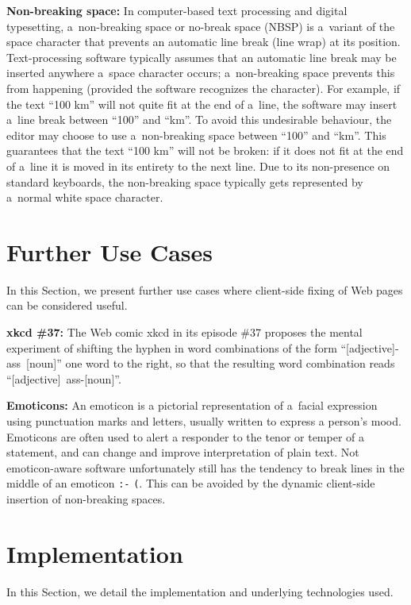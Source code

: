 \documentclass{acm_proc_article-sp}
\begin{document}
\textbf{Non-breaking space:} In computer-based text processing and digital typesetting,
a~non-breaking space or no-break space (NBSP) is a~variant of the space character that prevents an automatic line break (line wrap) at its position.
Text-processing software typically assumes that an automatic line break may be inserted anywhere a~space
character occurs;
a~non-breaking space prevents this from happening (provided the software recognizes the character).
For example, if the text ``100 km'' will not quite fit at the end of a~line,
the software may insert a~line break between ``100'' and ``km''.
To avoid this undesirable behaviour, the editor may choose to use a~non-breaking space between ``100'' and ``km''.
This guarantees that the text ``100 km'' will not be broken:
if it does not fit at the end of a~line
it is moved in its entirety to the next line.
Due to its non-presence on standard keyboards,
the non-breaking space typically gets represented by a~normal white space character.

\section{Further Use Cases}
In this Section, we present further use cases where client-side fixing of Web pages can be considered useful.

\textbf{xkcd \#37:} The Web comic xkcd in its episode \#37 proposes the mental experiment of shifting the hyphen in word combinations of the form \mbox{``[adjective]-ass [noun]''} one word to the right,
so that the resulting word combination reads \mbox{``[adjective] ass-[noun]''}.

\textbf{Emoticons:} An emoticon is a pictorial representation of a~facial expression using punctuation marks and letters,
usually written to express a person's mood.
Emoticons are often used to alert a responder to the tenor or temper of a statement,
and can change and improve interpretation of plain text.
Not emoticon-aware software unfortunately still has the tendency to break lines in the middle of an emoticon \texttt{:-} \linebreak %
\texttt{(}. This can be avoided by the dynamic client-side insertion of non-breaking spaces.

\section{Implementation}
In this Section, we detail the implementation and underlying technologies used.
\end{document}

